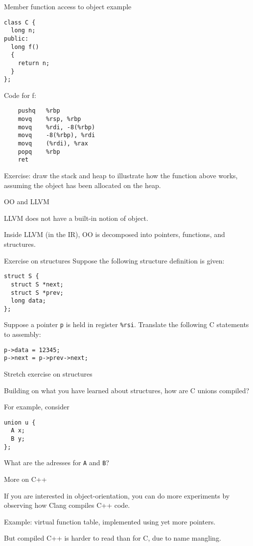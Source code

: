\documentclass[landscape]{beamer}
\begin{document}
\begin{frame}[fragile]{Member function access to object example}
\begin{minipage}{.5\textwidth}
\begin{verbatim}
class C {
  long n;
public:
  long f() 
  { 
    return n; 
  }
};
\end{verbatim}
\end{minipage}
%
\begin{minipage}{.4\textwidth}
Code for f:
\begin{verbatim}
	pushq	%rbp
	movq	%rsp, %rbp
	movq	%rdi, -8(%rbp)
	movq	-8(%rbp), %rdi
	movq	(%rdi), %rax
	popq	%rbp
	ret
\end{verbatim}
\end{minipage}

\vspace{3em}

Exercise: draw the stack and heap to illustrate how the function above works, assuming the object has been allocated on the heap.
\end{frame}

\begin{frame}{OO and LLVM}

LLVM does not have a built-in notion of object.

Inside LLVM (in the IR), OO is decomposed into pointers, functions, and structures.

\end{frame}

\begin{frame}[fragile]{Exercise on structures}
Suppose the following structure definition is given:
\begin{verbatim}
struct S {
  struct S *next;
  struct S *prev;
  long data;
};
\end{verbatim}
%
Suppose a pointer \texttt p is held in register \texttt{\%rsi}. Translate the following C statements to assembly:
\begin{verbatim}
p->data = 12345;
p->next = p->prev->next;
\end{verbatim}
\end{frame}

\begin{frame}[fragile]{Stretch exercise on structures}

Building on what you have learned about structures, how are C unions compiled?

For example, consider 
\begin{verbatim}
union u {
  A x;
  B y;
};
\end{verbatim}

What are the adresses for \texttt{A} and \texttt{B}?
\end{frame}

\begin{frame}{More on C++}

If you are interested in object-orientation, you can do more experiments by observing how Clang compiles C++ code.

Example: virtual function table, implemented using yet more pointers.

But compiled C++ is harder to read than for C, due to name mangling. 
\end{frame}
\end{document}
